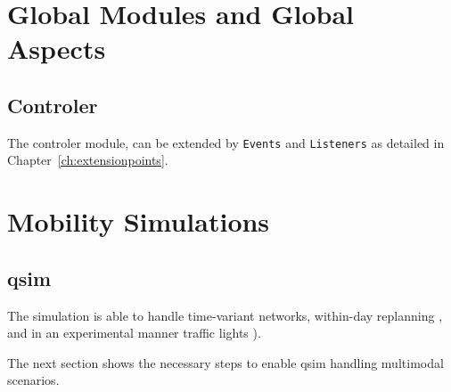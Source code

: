 \section{Global Modules and Global Aspects}
\label{sec:extending-globalmodules}
\subsection{Controler}
\label{sec:extending-controler}
The controler module, can be extended by \lstinline|Events| and \lstinline|Listeners| as detailed in Chapter~\ref{ch:extensionpoints}. 
%


\section{Mobility Simulations}
\label{sec:extending-mobsims}
\subsection{\protect\gls{qsim}}
\label{sec:extending-qsim}
The simulation is able to handle time-variant networks, within-day replanning \citep[][]{Dobler_TechRep_IVT_2009}, and in an experimental manner traffic lights \citep[][]{Neumann_MastersThesis_2008}).

The next section shows the necessary steps to enable \gls{qsim} handling \gls{multimodal} scenarios.

